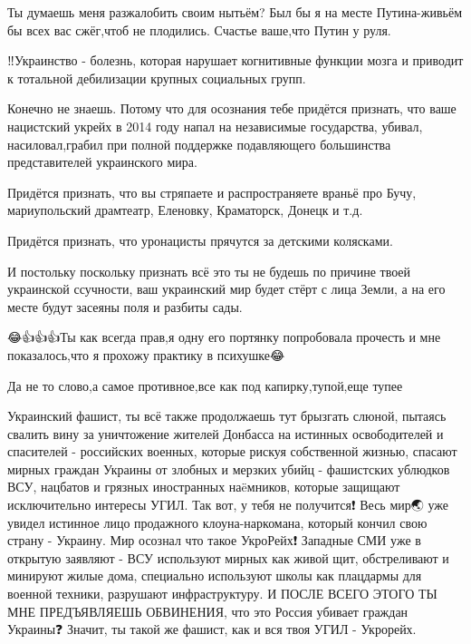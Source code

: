 
Ты думаешь меня разжалобить своим нытьём? Был бы я на месте Путина-живьём бы
всех вас сжёг,чтоб не плодились. Счастье ваше,что Путин у руля.


‼Украинство - болезнь, которая нарушает когнитивные функции мозга и приводит к
тотальной дебилизации крупных социальных групп.🐷 🐷 🐷


Конечно не знаешь. Потому что для осознания тебе придётся признать, что ваше
нацистский укрейх в 2014 году напал на независимые государства, убивал,
насиловал,грабил при полной поддержке подавляющего большинства представителей
украинского мира.

Придётся признать, что вы стряпаете и распространяете враньё про Бучу,
мариупольский драмтеатр, Еленовку, Краматорск, Донецк и т.д.

Придётся признать, что уронацисты прячутся за детскими колясками.

И постольку поскольку признать всё это ты не будешь по причине твоей украинской
ссучности, ваш украинский мир будет стёрт с лица Земли, а на его месте будут
засеяны поля и разбиты сады.

😂👍👍👍Ты как всегда прав,я одну его портянку попробовала прочесть и мне показалось,что я прохожу практику в психушке😂


Да не то слово,а самое противное,все как под капирку,тупой,еще тупее


Украинский фашист, ты всё также продолжаешь тут брызгать слюной, пытаясь свалить вину за уничтожение жителей Донбасса на истинных освободителей и спасителей - российских военных, которые рискуя собственной жизнью, спасают мирных граждан Украины от злобных и мерзких убийц - фашистских ублюдков ВСУ, нацбатов и грязных иностранных наëмников, которые защищают исключительно интересы УГИЛ.
Так вот, у тебя не получится❗️
Весь мир🌏 уже увидел истинное лицо продажного клоуна-наркомана, который кончил свою страну - Украину. Мир осознал что такое УкроРейх❗️
Западные СМИ уже в открытую заявляют - ВСУ используют мирных как живой щит, обстреливают и минируют жилые дома, специально используют школы как плацдармы для военной техники, разрушают инфраструктуру.
И ПОСЛЕ ВСЕГО ЭТОГО ТЫ МНЕ ПРЕДЪЯВЛЯЕШЬ ОБВИНЕНИЯ, что это Россия убивает граждан Украины❓
Значит, ты такой же фашист, как и вся твоя УГИЛ - Укрорейх.

